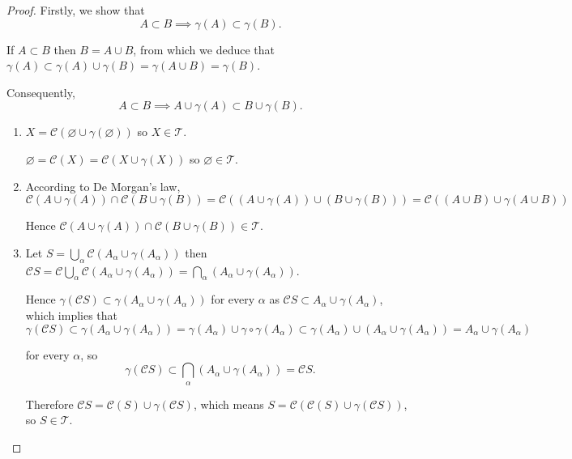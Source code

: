 \begin{proof}
    Firstly, we show that
    \[
        A \subset B \implies \gamma(A) \subset \gamma(B).
    \]

    If \( A \subset B \) then \( B = A \cup B \), from which we deduce that \( \gamma(A) \subset \gamma(A) \cup \gamma(B) = \gamma(A \cup B) = \gamma(B) \).

    Consequently,
    \[ A \subset B \implies A \cup \gamma(A) \subset B \cup \gamma(B). \]

    \begin{enumerate}[label={(\roman*)}]
        \item \( X = \mathscr{C}(\varnothing \cup \gamma(\varnothing)) \) so \( X \in \mathscr{T} \).

              \( \varnothing = \mathscr{C}(X) = \mathscr{C}(X \cup \gamma(X)) \) so \( \varnothing \in \mathscr{T} \).
        \item According to De Morgan's law,
              \[  \mathscr{C}(A \cup \gamma(A)) \cap \mathscr{C}(B \cup \gamma(B)) = \mathscr{C}((A \cup \gamma(A)) \cup (B \cup \gamma(B))) = \mathscr{C}((A \cup B) \cup \gamma(A \cup B)) \]

              Hence \(\mathscr{C}(A \cup \gamma(A)) \cap \mathscr{C}(B \cup \gamma(B)) \in \mathscr{T}\).
        \item Let \( S = \bigcup_{\alpha} \mathscr{C}(A_{\alpha} \cup \gamma(A_{\alpha})) \) then \( \mathscr{C}S = \mathscr{C}\bigcup_{\alpha} \mathscr{C}(A_{\alpha} \cup \gamma(A_{\alpha})) = \bigcap_{\alpha}(A_{\alpha} \cup \gamma(A_{\alpha})) \).

              Hence \( \gamma(\mathscr{C}S) \subset \gamma(A_{\alpha} \cup \gamma(A_{\alpha})) \) for every \( \alpha \) as \( \mathscr{C}S \subset A_{\alpha} \cup \gamma(A_{\alpha}) \), which implies that
              \[
                  \gamma(\mathscr{C}S) \subset \gamma(A_{\alpha} \cup \gamma(A_{\alpha})) = \gamma(A_{\alpha}) \cup \gamma\circ\gamma(A_{\alpha}) \subset \gamma(A_{\alpha}) \cup (A_{\alpha} \cup \gamma(A_{\alpha})) = A_{\alpha} \cup \gamma(A_{\alpha})
              \]

              for every \(\alpha\), so
              \[
                  \gamma(\mathscr{C}S) \subset \bigcap_{\alpha} (A_{\alpha} \cup \gamma(A_{\alpha})) = \mathscr{C}S.
              \]

              Therefore \( \mathscr{C}S = \mathscr{C}(S) \cup \gamma(\mathscr{C}S) \), which means \( S = \mathscr{C}(\mathscr{C}(S) \cup \gamma(\mathscr{C}S)) \), so \( S \in \mathscr{T} \).
    \end{enumerate}


\end{proof}
